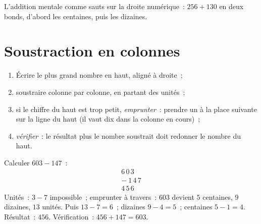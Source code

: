 \begin{omfigure}

{\small L'addition mentale comme sauts sur la droite numérique~:
$256 + 130$ en deux bonds, d'abord les centaines, puis les dizaines.}
\end{omfigure}

\section{Soustraction en colonnes}

\begin{method}\label{met:g3:addsub:sub}
\begin{enumerate}
  \item Écrire le plus grand nombre en haut, aligné à droite~;
  \item soustraire colonne par colonne, en partant des unités~;
  \item si le chiffre du haut est trop petit, \emph{emprunter}~:
        prendre un à la place suivante sur la ligne du haut (il vaut
        dix dans la colonne en cours)~;
  \item \emph{vérifier}~: le résultat plus le nombre soustrait
        doit redonner le nombre du haut.
\end{enumerate}
\end{method}

\begin{example}\label{ex:g3:addsub:sub}
Calculer $603 - 147$~:
\[
\begin{array}{r}
6\,0\,3 \\
-\ 1\,4\,7 \\
\hline
4\,5\,6
\end{array}
\]
Unités~: $3 - 7$ impossible~; emprunter à travers~: $603$ devient
$5$ centaines, $9$ dizaines, $13$ unités. Puis $13 - 7 = 6$~;
dizaines $9 - 4 = 5$~; centaines $5 - 1 = 4$. Résultat~: $456$.
Vérification~: $456 + 147 = 603$.
\end{example}

